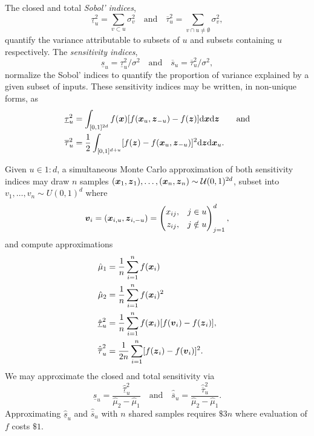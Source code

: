 \documentclass{article}
\begin{document}
The closed and total \emph{Sobol' indices},
\begin{equation}
    \underline{\tau}_u^2 = \sum_{v \subset u} \sigma^2_v \quad \text{and} \quad 
    \overline{\tau}_u^2 = \sum_{v \cap u \neq \emptyset} \sigma^2_v,
\end{equation}
quantify the variance attributable to subsets of $u$ and subsets containing $u$ respectively. The \emph{sensitivity indices},
\begin{equation}
    \underline{s}_u = \underline{\tau}_u^2/\sigma^2 \quad \text{and} \quad 
    \overline{s}_u = \overline{\tau}_u^2/\sigma^2,
\end{equation}
normalize the Sobol' indices to quantify the proportion of variance explained by a given subset of inputs. These sensitivity indices may be written, in non-unique forms, as
\begin{align}
    \underline{\tau}_u^2 &= \int_{[0,1]^{2d}} f(\boldsymbol{x})[f(\boldsymbol{x}_u,\boldsymbol{z}_{-u})-f(\boldsymbol{z})]\mathrm{d}\boldsymbol{x}\mathrm{d}\boldsymbol{z} \qquad \text{and} \\
    \overline{\tau}_u^2 &= \frac{1}{2}\int_{[0,1]^{d+u}} [f(\boldsymbol{z})-f(\boldsymbol{x}_u,\boldsymbol{z}_{-u})]^2\mathrm{d}\boldsymbol{z}\mathrm{d}\boldsymbol{x}_u.
\end{align}

Given $u \in 1:d$, a simultaneous Monte Carlo approximation of both sensitivity indices may draw $n$ samples $(\boldsymbol{x}_1,\boldsymbol{z}_1), \dots, (\boldsymbol{x}_n,\boldsymbol{z}_n) \sim \mathcal{U}(0,1)^{2d}$, subset into $v_1,\dots,v_n \sim U(0,1)^d$ where
\begin{equation}
    \boldsymbol{v}_i = (\boldsymbol{x}_{i,u},\boldsymbol{z}_{i,-u}) = \left(\begin{aligned}x_{ij}, \quad & j \in u \\ z_{ij}, \quad & j \notin u \end{aligned}\right)_{j=1}^d,
\end{equation}
and compute approximations
\begin{subequations}
\label{eq:int_approxs}
\begin{align}
    \hat{\mu}_1 &= \frac{1}{n} \sum_{i=1}^n f(\bx_i) \\ %
    \hat{\mu}_2 &= \frac{1}{n} \sum_{i=1}^n f(\bx_i)^2 \\ %
    \hat{\underline{\tau}}_u^2 &= \frac{1}{n} \sum_{i=1}^n f(\bx_i)[f(\bv_i) - f(\bz_i)], \\ %
    \hat{\overline{\tau}}_u^2 &= \frac{1}{2n} \sum_{i=1}^n [f(\bz_i)-f(\bv_i)]^2. %
\end{align}
\end{subequations}
We may approximate the closed and total sensitivity via
\begin{equation}
    \hat{\underline{s}}_u = \frac{\hat{\underline{\tau}}_u^2}{\hat{\mu}_2-\hat{\mu}_1} \quad \text{and} \quad 
    \hat{\overline{s}}_u = \frac{\hat{\overline{\tau}}_u^2}{\hat{\mu}_2-\hat{\mu}_1}.
\end{equation}
Approximating $\hat{\underline{s}}_u$ and $\hat{\overline{s}}_u$ with $n$ shared samples requires $\$3n$ where evaluation of $f$ costs $\$1$. 
\end{document}
